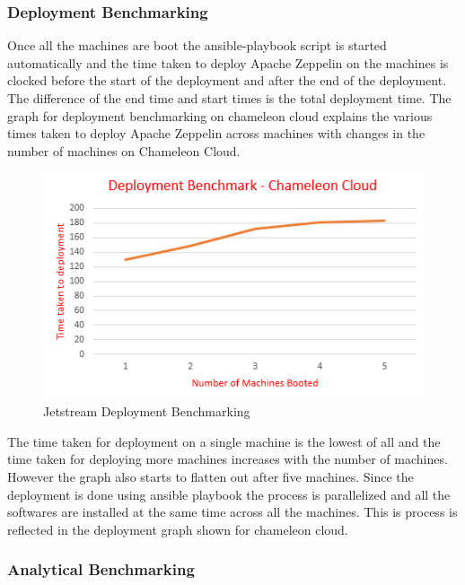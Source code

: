 \documentclass[9pt,twocolumn,twoside]{../../styles/osajnl}
\begin{document}
\subsubsection{Deployment Benchmarking}

Once all the machines are boot the ansible-playbook script is started 
automatically and the time taken to deploy Apache Zeppelin on the 
machines is clocked before the start of the deployment and after the 
end of the deployment. The difference of the end time and start times 
is the total deployment time. The graph for deployment benchmarking 
on chameleon cloud explains the various 
times taken to deploy Apache Zeppelin across machines with changes in 
the number of machines on Chameleon Cloud.

\begin{figure}
	\includegraphics[width=\linewidth]{./images/chameleon_deployment_time}
	\caption{Jetstream Deployment Benchmarking}
	\label{fig:Jetstream Deployment Benchmarking}
\end{figure}

The time taken for deployment on a single machine is the lowest of 
all and the time taken for deploying more machines increases with the 
number of machines. However the graph also starts to flatten out 
after five machines. Since the deployment is done using ansible 
playbook the process is parallelized and all the softwares are 
installed at the same time across all the machines. This is process 
is reflected in the deployment graph shown for chameleon cloud.

\subsubsection{Analytical Benchmarking}
\end{document}

